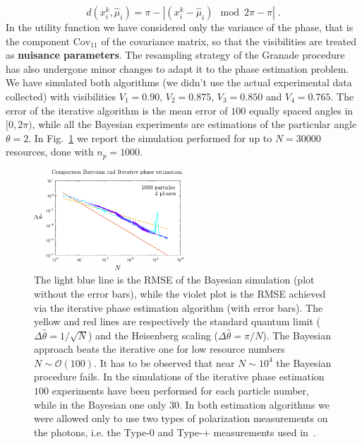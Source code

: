 \documentclass[aps, pra, 10pt, twocolumn, superscriptaddress,floatfix]{revtex4-1}
\begin{document}
%
\begin{equation}
	d(x^k_i, \hat{\mu}_i) = \pi - | (x^k_i - \hat{\mu}_i) \mod 2 \pi - \pi| \; .
\end{equation}
%
In the utility function we have considered only the variance of the phase, that is the component $\text{Cov}_{11}$ of the covariance matrix, so that the visibilities are treated as \textbf{nuisance parameters}. The resampling strategy of the Granade procedure has also undergone minor changes to adapt it to the phase estimation problem. We have simulated both algorithms (we didn't use the actual experimental data collected) with visibilities $V_1 = 0.90$, $V_2 = 0.875$, $V_3 = 0.850$ and $V_4 = 0.765$. The error of the iterative algorithm is the mean error of $100$ equally spaced angles in $[0, 2 \pi)$, while all the Bayesian experiments are estimations of the particular angle $\theta = 2$. In Fig.~\ref{fig:30000.pdf} we report the simulation performed for up to $N = 30000$ resources, done with $n_p = 1000$.
%
\begin{figure}[!t]
	\begin{center}
		\includegraphics[width=0.5\textwidth]{immagini/30000.pdf}
	\end{center}
	\caption{The light blue line is the RMSE of the Bayesian simulation (plot without the error bars), while the violet plot is the RMSE achieved via the iterative phase estimation algorithm (with error bars). The yellow and red lines are respectively the standard quantum limit ($\Delta \hat{\theta} = 1/\sqrt{N}$) and the Heisenberg scaling ($\Delta \hat{\theta} = \pi/N$). The Bayesian approach beats the iterative one for low resource numbers $N \sim \mathcal{O} (100)$. It has to be observed that near $N \sim 10^4$ the Bayesian procedure fails. In the simulations of the iterative phase estimation $100$ experiments have been performed for each particle number, while in the Bayesian one only $30$. In both estimation algorithms we were allowed only to use two types of polarization measurements on the photons, i.e. the Type-$0$ and Type-$+$ measurements used in~\cite{Belliardo2020}.}
	\label{fig:30000.pdf}
\end{figure}
\end{document}
